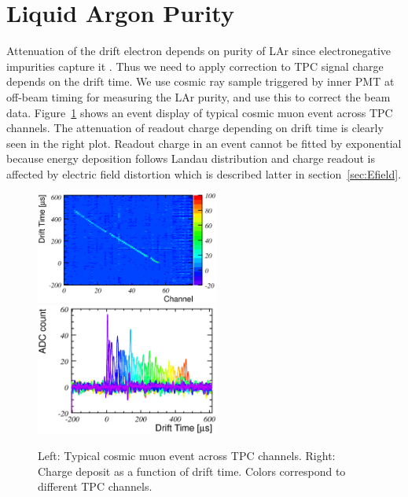 \section{Liquid Argon Purity}

Attenuation of the drift electron depends on purity of LAr since electronegative impurities capture it \cite{purity}. 
Thus we need to apply correction to TPC signal charge depends on the drift time.
We use cosmic ray sample triggered by inner PMT at off-beam timing for measuring the LAr purity, and use this to correct the beam data.
Figure~\ref{fig:CosmicEvent} shows an event display of typical cosmic muon event across TPC channels.
The attenuation of readout charge depending on drift time is clearly seen in the right plot. 
Readout charge in an event cannot be fitted by exponential because energy deposition follows Landau distribution and charge readout is affected by electric field distortion which is described latter in section~\ref{sec:Efield}.



\begin{figure}[htbp]
 \begin{center}
  \includegraphics[width=60mm]{fig/cosmic68_ev258_display.eps}
  \includegraphics[width=60mm]{fig/cosmic68_ev258.eps}
 \end{center}
 \caption{Left: Typical cosmic muon event across TPC channels. Right: Charge deposit as a function of drift time. Colors correspond to different TPC channels.}
 \label{fig:CosmicEvent}
\end{figure}

